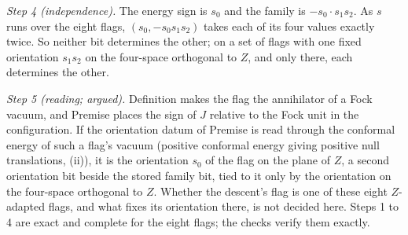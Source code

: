 \emph{Step 4 (independence).} The energy sign is $s_{0}$ and the family is $-s_{0}\cdot s_{1}s_{2}$. As $s$ runs over the eight flags, $(s_{0}, -s_{0}s_{1}s_{2})$ takes each of its four values exactly twice. So neither bit determines the other; on a set of flags with one fixed orientation $s_{1}s_{2}$ on the four-space orthogonal to $Z$, and only there, each determines the other.

\emph{Step 5 (reading; argued).} Definition  makes the flag the annihilator of a Fock vacuum, and Premise  places the sign of $J$ relative to the Fock unit in the configuration. If the orientation datum of Premise  is read through the conformal energy of such a flag's vacuum (positive conformal energy giving positive null translations, (ii)), it is the orientation $s_{0}$ of the flag on the plane of $Z$, a second orientation bit beside the stored family bit, tied to it only by the orientation on the four-space orthogonal to $Z$. Whether the descent's flag is one of these eight $Z$-adapted flags, and what fixes its orientation there, is not decided here. Steps 1 to 4 are exact and complete for the eight flags; the checks verify them exactly.
